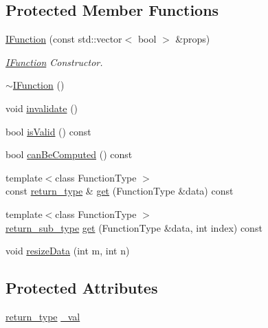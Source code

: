 \subsection*{Protected Member Functions}
\begin{DoxyCompactItemize}
\item 
\hyperlink{classocra_1_1IFunction_a6aa2340376a035f9b80c747b09e701fa}{I\+Function} (const std\+::vector$<$ bool $>$ \&props)
\begin{DoxyCompactList}\small\item\em \hyperlink{classocra_1_1IFunction}{I\+Function} Constructor. \end{DoxyCompactList}\item 
\hyperlink{classocra_1_1IFunction_a60204ea5f57d3f369915022c9e431e32}{$\sim$\+I\+Function} ()
\item 
void \hyperlink{classocra_1_1IFunction_ae7cc0015416e006ad5682e7980f9c3d8}{invalidate} ()
\item 
bool \hyperlink{classocra_1_1IFunction_a22c891e865fd6a72ba1b3241010b4ecf}{is\+Valid} () const
\item 
bool \hyperlink{classocra_1_1IFunction_a18703c0b7573f9a1629236c9e10150d9}{can\+Be\+Computed} () const
\item 
{\footnotesize template$<$class Function\+Type $>$ }\\const \hyperlink{classocra_1_1IFunction_a04d351c2f938d01046328b54fb7e6525}{return\+\_\+type} \& \hyperlink{classocra_1_1IFunction_a0f7422af163eedba66749b79b9a70787}{get} (Function\+Type \&data) const
\item 
{\footnotesize template$<$class Function\+Type $>$ }\\\hyperlink{classocra_1_1IFunction_ac6604adbd04613e1f545fb522cedbe3d}{return\+\_\+sub\+\_\+type} \hyperlink{classocra_1_1IFunction_a53aa631366a527facee4f587ff8f7e09}{get} (Function\+Type \&data, int index) const
\item 
void \hyperlink{classocra_1_1IFunction_aab980c69fa11a61cbd49dad56dddca76}{resize\+Data} (int m, int n)
\end{DoxyCompactItemize}
\subsection*{Protected Attributes}
\begin{DoxyCompactItemize}
\item 
\hyperlink{classocra_1_1IFunction_a04d351c2f938d01046328b54fb7e6525}{return\+\_\+type} \hyperlink{classocra_1_1IFunction_a0796c853731943530bc6c772035dca0a}{\+\_\+val}
\end{DoxyCompactItemize}


